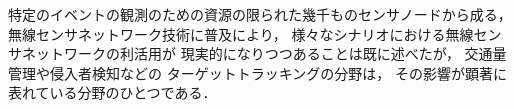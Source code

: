 %
%


特定のイベントの観測のための資源の限られた幾千ものセンサノードから成る，
無線センサネットワーク技術に普及により，
様々なシナリオにおける無線センサネットワークの利活用が
現実的になりつつあることは既に述べたが，
交通量管理や侵入者検知などの
ターゲットトラッキングの分野は，
その影響が顕著に表れている分野のひとつである．

